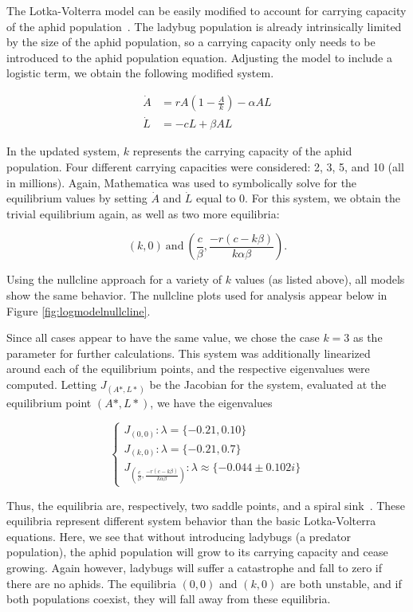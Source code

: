 \documentclass[10pt]{article}
\begin{document}
The Lotka-Volterra model can be easily modified to account for carrying capacity of the aphid population~\cite{beltrami}. The ladybug population is already intrinsically limited by the size of the aphid population, so a carrying capacity only needs to be introduced to the aphid population equation. Adjusting the model to include a logistic term, we obtain the following modified system.

\begin{align}
\dot{A} &= rA\left( 1-\frac{A}{k} \right) - \alpha A L \label{eq:logA}\\
\dot{L} &= -cL + \beta A L \label{eq:logL}
\end{align}

In the updated system, \(k\) represents the carrying capacity of the aphid population. Four different carrying capacities were considered: 2, 3, 5, and 10 (all in millions). Again, Mathematica was used to symbolically solve for the equilibrium values by setting \(\dot{A}\) and \(\dot{L}\) equal to 0. For this system, we obtain the trivial equilibrium again, as well as two more equilibria:

\[(k,0) \ \mathrm{and} \ \left (\frac{c}{\beta}, \frac{-r(c-k\beta)}{k\alpha\beta}\right).\]

Using the nullcline approach for a variety of \(k\) values (as listed above), all models show the same behavior. The nullcline plots used for analysis appear below in Figure \ref{fig:logmodelnullcline}.

Since all cases appear to have the same value, we chose the case \(k=3\) as the parameter for further calculations. This system was additionally linearized around each of the equilibrium points, and the respective eigenvalues were computed. Letting \(J_{(A*,L*)}\) be the Jacobian for the system, evaluated at the equilibrium point \((A*,L*)\), we have the eigenvalues

\[\begin{cases}
J_{ (0,0) }: \lambda = \{-0.21,0.10\} \\
J_{ (k,0) }: \lambda = \{-0.21,0.7\} \\
J_{ ( \frac{c}{\beta} ,\frac{-r(c-k\beta)}{k\alpha\beta}) }: \lambda \approx \{ -0.044 \pm 0.102i \}
\end{cases}
\]

Thus, the equilibria are, respectively, two saddle points, and a spiral sink~\cite{TDplane}. These equilibria represent different system behavior than the basic Lotka-Volterra equations. Here, we see that without introducing ladybugs (a predator population), the aphid population will grow to its carrying capacity and cease growing. Again however, ladybugs will suffer a catastrophe and fall to zero if there are no aphids. The equilibria \((0,0)\) and \((k,0)\) are both unstable, and if both populations coexist, they will fall away from these equilibria.
\end{document}
